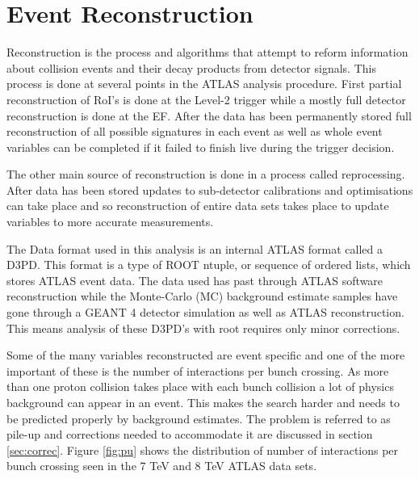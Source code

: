 \chapter{Event Reconstruction}

Reconstruction is the process and algorithms that attempt to reform information about collision events and their decay products from detector signals. This process is done at several points in the ATLAS analysis procedure. First partial reconstruction of RoI's is done at the Level-2 trigger while a mostly full detector reconstruction is done at the EF. After the data has been permanently stored full reconstruction of all possible signatures in each event as well as whole event variables can be completed if it failed to finish live during the trigger decision.

The other main source of reconstruction is done in a process called reprocessing. After data has been stored updates to sub-detector calibrations and optimisations can take place and so reconstruction of entire data sets takes place to update variables to more accurate measurements. 

The Data format used in this analysis is an internal ATLAS format called a D3PD. This format is a type of ROOT \cite{Antcheva20092499} ntuple, or sequence of ordered lists, which stores ATLAS event data. The data used has past through ATLAS software reconstruction while the Monte-Carlo (MC) background estimate samples have gone through a GEANT 4 \cite{Agostinelli2003250} detector simulation as well as ATLAS reconstruction. This means analysis of these D3PD's with root requires only minor corrections.


Some of the many variables reconstructed are event specific and one of the more important of these is the number of interactions per bunch crossing. As more than one proton collision takes place with each bunch collision a lot of physics background can appear in an event. This makes the search harder and needs to be predicted properly by background estimates. The problem is referred to as pile-up and corrections needed to accommodate it are discussed in section \ref{sec:correc}. Figure \ref{fig:pu} shows the distribution of number of interactions per bunch crossing seen in the 7 TeV and 8 TeV ATLAS data sets.

